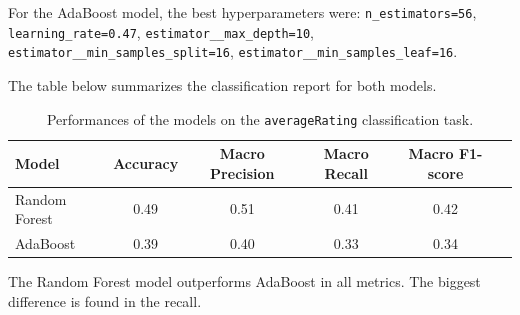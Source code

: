For the AdaBoost model, the best hyperparameters were:
\texttt{n\_estimators=56}, \texttt{learning\_rate=0.47},
\texttt{estimator\_\_max\_depth=10},
\texttt{estimator\_\_min\_samples\_split=16},
\texttt{estimator\_\_min\_samples\_leaf=16}.

The table below summarizes the classification report for both models.
\begin{table}[H]
    \centering
    \label{tab:classification_report}
    \begin{tabular}{lccccc}
    \hline
    \textbf{Model} & \textbf{Accuracy} & \textbf{Macro Precision} & \textbf{Macro Recall} & \textbf{Macro F1-score} \\
    \hline
    Random Forest & 0.49 & 0.51 & 0.41 & 0.42 \\
    AdaBoost & 0.39 & 0.40 & 0.33 & 0.34 \\
    \hline
    \end{tabular}
    \caption{Performances of the models on the \texttt{averageRating} classification task.}
\end{table}

The Random Forest model outperforms AdaBoost in all metrics.
The biggest difference is found in the recall.

